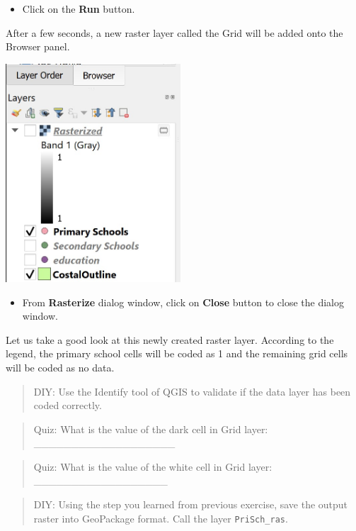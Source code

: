 \documentclass[
  letterpaper,
  DIV=11,
  numbers=noendperiod]{scrreprt}
\providecommand{\tightlist}{%
  \setlength{\itemsep}{0pt}\setlength{\parskip}{0pt}}\usepackage{longtable,booktabs,array}
\begin{document}
\begin{itemize}
\tightlist
\item
  Click on the \textbf{Run} button.
\end{itemize}

After a few seconds, a new raster layer called the Grid will be added
onto the Browser panel.

\includegraphics[width=2.57292in,height=\textheight]{./img06/image11.jpg}

\begin{itemize}
\tightlist
\item
  From \textbf{Rasterize} dialog window, click on \textbf{Close} button
  to close the dialog window.
\end{itemize}

Let us take a good look at this newly created raster layer. According to
the legend, the primary school cells will be coded as 1 and the
remaining grid cells will be coded as no data.

\begin{quote}
DIY: Use the Identify tool of QGIS to validate if the data layer has
been coded correctly.
\end{quote}

\begin{quote}
Quiz: What is the value of the dark cell in Grid layer:
\_\_\_\_\_\_\_\_\_\_\_\_\_\_\_\_\_\_\_
\end{quote}

\begin{quote}
Quiz: What is the value of the white cell in Grid layer:
\_\_\_\_\_\_\_\_\_\_\_\_\_\_\_\_\_\_
\end{quote}

\begin{quote}
DIY: Using the step you learned from previous exercise, save the output
raster into GeoPackage format. Call the layer \texttt{PriSch\_ras}.
\end{quote}
\end{document}
